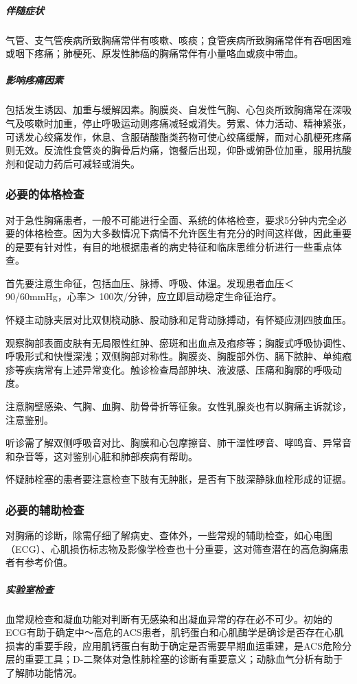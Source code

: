 \subparagraph{伴随症状}

气管、支气管疾病所致胸痛常伴有咳嗽、咳痰；食管疾病所致胸痛常伴有吞咽困难或咽下疼痛；肺梗死、原发性肺癌的胸痛常伴有小量咯血或痰中带血。

\subparagraph{影响疼痛因素}

包括发生诱因、加重与缓解因素。胸膜炎、自发性气胸、心包炎所致胸痛常在深吸气及咳嗽时加重，停止呼吸运动则疼痛减轻或消失。劳累、体力活动、精神紧张，可诱发心绞痛发作，休息、含服硝酸酯类药物可使心绞痛缓解，而对心肌梗死疼痛则无效。反流性食管炎的胸骨后灼痛，饱餐后出现，仰卧或俯卧位加重，服用抗酸剂和促动力药后可减轻或消失。

\subsubsection{必要的体格检查}

对于急性胸痛患者，一般不可能进行全面、系统的体格检查，要求5分钟内完全必要的体格检查。因为大多数情况下病情不允许医生有充分的时间这样做，因此重要的是要有针对性，有目的地根据患者的病史特征和临床思维分析进行一些重点体查。

首先要注意生命征，包括血压、脉搏、呼吸、体温。发现患者血压＜
90/60mmHg，心率＞ 100次/分钟，应立即启动稳定生命征治疗。

怀疑主动脉夹层对比双侧桡动脉、股动脉和足背动脉搏动，有怀疑应测四肢血压。

观察胸部表面皮肤有无局限性红肿、瘀斑和出血点及疱疹等；胸腹式呼吸协调性、呼吸形式和快慢深浅；双侧胸部对称性。胸膜炎、胸腹部外伤、膈下脓肿、单纯疱疹等疾病常有上述异常变化。触诊检查局部肿块、液波感、压痛和胸廓的呼吸动度。

注意胸壁感染、气胸、血胸、肋骨骨折等征象。女性乳腺炎也有以胸痛主诉就诊，注意鉴别。

听诊需了解双侧呼吸音对比、胸膜和心包摩擦音、肺干湿性啰音、哮鸣音、异常音和杂音等，这对鉴别心脏和肺部疾病有帮助。

怀疑肺栓塞的患者要注意检查下肢有无肿胀，是否有下肢深静脉血栓形成的证据。

\subsubsection{必要的辅助检查}

对胸痛的诊断，除需仔细了解病史、查体外，一些常规的辅助检查，如心电图（ECG）、心肌损伤标志物及影像学检查也十分重要，这对筛查潜在的高危胸痛患者有参考价值。

\subparagraph{实验室检查}

血常规检查和凝血功能对判断有无感染和出凝血异常的存在必不可少。初始的ECG有助于确定中～高危的ACS患者，肌钙蛋白和心肌酶学是确诊是否存在心肌损害的重要手段，应用肌钙蛋白有助于确定是否需要早期血运重建，是ACS危险分层的重要工具；D-二聚体对急性肺栓塞的诊断有重要意义；动脉血气分析有助于了解肺功能情况。

